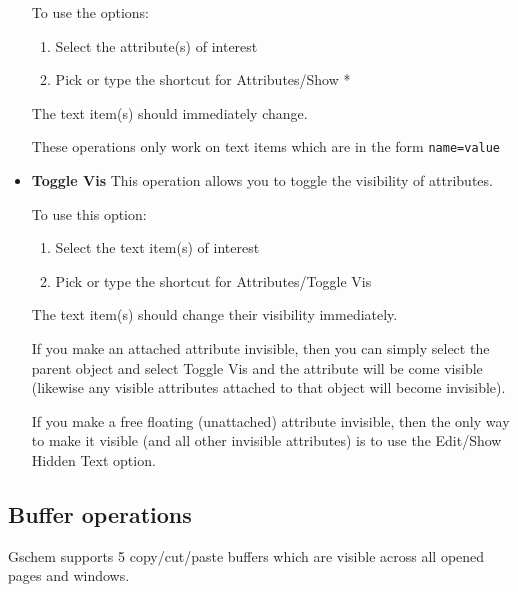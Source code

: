 \documentclass{article}
\begin{document}
\begin{itemize}
  To use the options:
\begin{enumerate}
\item Select the attribute(s) of interest
\item Pick or type the shortcut for Attributes/Show *
\end{enumerate}        
The text item(s) should immediately change.

These operations only work on text items which are in the form
{\tt name=value}

\item {\bf Toggle Vis} This operation allows you to toggle the
  visibility of attributes.
  
  To use this option:
\begin{enumerate}
\item Select the text item(s) of interest
\item Pick or type the shortcut for Attributes/Toggle Vis
\end{enumerate}
The text item(s) should change their visibility immediately.
                
If you make an attached attribute invisible, then you can simply
select the parent object and select Toggle Vis and the attribute will
be come visible (likewise any visible attributes attached to that
object will become invisible).

If you make a free floating (unattached) attribute invisible, then the
only way to make it visible (and all other invisible attributes) is to
use the Edit/Show Hidden Text option.

\end{itemize}
\subsection{Buffer operations}
Gschem supports 5 copy/cut/paste buffers which are visible across all
opened pages and windows.
\end{document}
